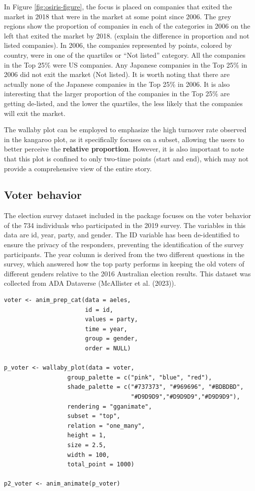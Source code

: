 In Figure \ref{fig:osiris-figure}, the focus is placed on companies that exited the market in 2018 that were in the market at some point since 2006. The grey regions show the proportion of companies in each of the categories in 2006 on the left that exited the market by 2018. (explain the difference in proportion and not listed companies). In 2006, the companies represented by points, colored by country, were in one of the quartiles or ``Not listed'' category. All the companies in the Top 25\% were US companies. Any Japanese companies in the Top 25\% in 2006 did not exit the market (Not listed). It is worth noting that there are actually none of the Japanese companies in the Top 25\% in 2006. It is also interesting that the larger proportion of the companies in the Top 25\% are getting de-listed, and the lower the quartiles, the less likely that the companies will exit the market.

The wallaby plot can be employed to emphasize the high turnover rate observed in the kangaroo plot, as it specifically focuses on a subset, allowing the users to better perceive the \textbf{relative proportion}. However, it is also important to note that this plot is confined to only two-time points (start and end), which may not provide a comprehensive view of the entire story.

\hypertarget{voter-behavior}{%
\subsection{Voter behavior}\label{voter-behavior}}

The election survey dataset included in the  package focuses on the voter behavior of the 734 individuals who participated in the 2019 survey. The variables in this data are id, year, party, and gender. The ID variable has been de-identified to ensure the privacy of the responders, preventing the identification of the survey participants. The year column is derived from the two different questions in the survey, which answered how the top party performs in keeping the old voters of different genders relative to the 2016 Australian election results. This dataset was collected from ADA Dataverse (McAllister et al. (2023)).

\begin{verbatim}
voter <- anim_prep_cat(data = aeles,
                       id = id,
                       values = party,
                       time = year,
                       group = gender,
                       order = NULL)

p_voter <- wallaby_plot(data = voter,
                  group_palette = c("pink", "blue", "red"),
                  shade_palette = c("#737373", "#969696", "#BDBDBD",
                                    "#D9D9D9","#D9D9D9","#D9D9D9"),
                  rendering = "gganimate",
                  subset = "top",
                  relation = "one_many",
                  height = 1,
                  size = 2.5,
                  width = 100,
                  total_point = 1000)

p2_voter <- anim_animate(p_voter)
\end{verbatim}

